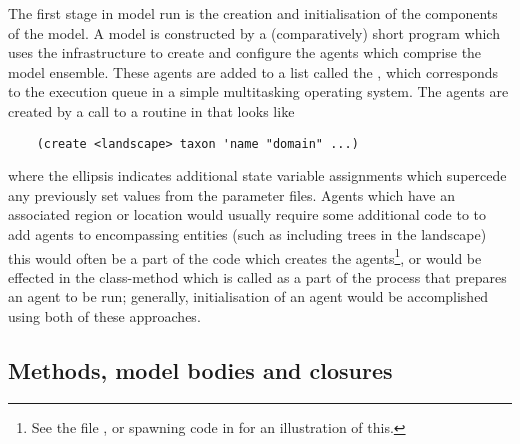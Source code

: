 The first stage in model run is the creation and initialisation of the
components of the model. A model is constructed by a (comparatively)
short \Scheme program which uses the infrastructure to create
and configure the agents which comprise the model ensemble.  These
agents are added to a list called the , which
corresponds to the execution queue in a simple multitasking operating
system. The agents are created by a call to a routine in
 that looks like
\begin{verbatim}
    (create <landscape> taxon 'name "domain" ...)
\end{verbatim}
where the ellipsis indicates additional state variable
assignments which supercede any previously set values from the
parameter files. Agents which have an associated region or location
would usually require some additional code to to add agents to
encompassing entities (such as including trees in the landscape) this
would often be a part of the code which creates the
agents\footnote{See the file , or spawning
  code in  for an illustration of this.},
or would be effected in the class-method 
which is called as a part of the process that prepares an agent to be
run; generally, initialisation of an agent would be accomplished using
both of these approaches.


\subsection{Methods, model bodies and closures}

